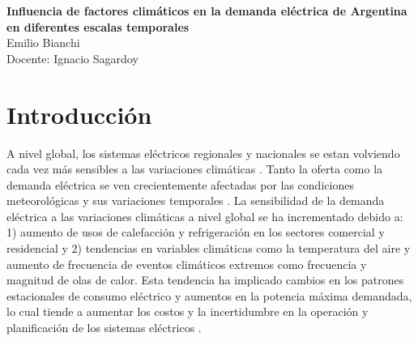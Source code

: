 \documentclass[11pt,a4paper]{article}
\begin{document}
	
\pagestyle{fancy}
\vspace{1cm}
\vspace{2cm}
\begin{center}
    \vspace{2em}
	{\Large \textbf{Influencia de factores climáticos en la demanda eléctrica de
			Argentina en diferentes escalas temporales}}\\
	\vspace{2em}  	
	{Emilio Bianchi}\\
	{Docente: Ignacio Sagardoy}
	\vspace{0.5em} 
\end{center}

\tableofcontents

\section{Introducción}
A nivel global, los sistemas eléctricos regionales y nacionales se estan volviendo cada vez más sensibles a las variaciones climáticas \cite{hoste2009matching}. Tanto la oferta como la demanda eléctrica se ven crecientemente afectadas por las condiciones meteorológicas y sus variaciones temporales \cite{dubus2018does, staffell2018increasing}. La sensibilidad de la demanda eléctrica a las variaciones climáticas a nivel global se ha incrementado debido a: 1) aumento de usos de calefacción y refrigeración en los sectores comercial y residencial \cite{auffhammer2014measuring, detemperatura, thornton2017relationship, cassarino2018impact} y 2) tendencias en variables climáticas como la temperatura del aire y aumento de frecuencia de eventos climáticos extremos \cite{apadula2012relationships, ke2016quantifying, anel2017impact} como frecuencia y magnitud de olas de calor. Esta tendencia ha implicado cambios en los patrones estacionales de consumo eléctrico y aumentos en la potencia máxima demandada, lo cual tiende a aumentar los costos y la incertidumbre en la operación y planificación de los sistemas eléctricos \cite{ke2016quantifying, detemperatura,anel2017impact}.
\end{document}
